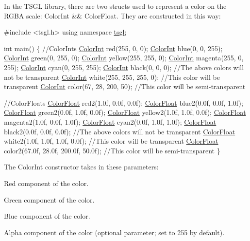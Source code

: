 In the T\+S\+G\+L library, there are two structs used to represent a color on the R\+G\+B\+A scale\+: {\ttfamily Color\+Int} \&\& {\ttfamily Color\+Float}. They are constructed in this way\+:


\begin{DoxyCode}
\textcolor{preprocessor}{#include <tsgl.h>}
\textcolor{keyword}{using namespace }\hyperlink{namespacetsgl}{tsgl};

\textcolor{keywordtype}{int} main() \{
  \textcolor{comment}{//ColorInts}
  \hyperlink{structtsgl_1_1_color_int}{ColorInt} red(255, 0, 0); 
  \hyperlink{structtsgl_1_1_color_int}{ColorInt} blue(0, 0, 255);
  \hyperlink{structtsgl_1_1_color_int}{ColorInt} green(0, 255, 0); 
  \hyperlink{structtsgl_1_1_color_int}{ColorInt} yellow(255, 255, 0);
  \hyperlink{structtsgl_1_1_color_int}{ColorInt} magenta(255, 0, 255);
  \hyperlink{structtsgl_1_1_color_int}{ColorInt} cyan(0, 255, 255);
  \hyperlink{structtsgl_1_1_color_int}{ColorInt} black(0, 0, 0);
  \textcolor{comment}{//The above colors will not be transparent}
  \hyperlink{structtsgl_1_1_color_int}{ColorInt} white(255, 255, 255, 0);  \textcolor{comment}{//This color will be transparent}
  \hyperlink{structtsgl_1_1_color_int}{ColorInt} color(67, 28, 200, 50); \textcolor{comment}{//This color will be semi-transparent  }


  \textcolor{comment}{//ColorFloats}
  \hyperlink{structtsgl_1_1_color_float}{ColorFloat} red2(1.0f, 0.0f, 0.0f); 
  \hyperlink{structtsgl_1_1_color_float}{ColorFloat} blue2(0.0f, 0.0f, 1.0f);
  \hyperlink{structtsgl_1_1_color_float}{ColorFloat} green2(0.0f, 1.0f, 0.0f); 
  \hyperlink{structtsgl_1_1_color_float}{ColorFloat} yellow2(1.0f, 1.0f, 0.0f);
  \hyperlink{structtsgl_1_1_color_float}{ColorFloat} magenta2(1.0f, 0.0f, 1.0f);
  \hyperlink{structtsgl_1_1_color_float}{ColorFloat} cyan2(0.0f, 1.0f, 1.0f);
  \hyperlink{structtsgl_1_1_color_float}{ColorFloat} black2(0.0f, 0.0f, 0.0f);
  \textcolor{comment}{//The above colors will not be transparent}
  \hyperlink{structtsgl_1_1_color_float}{ColorFloat} white2(1.0f, 1.0f, 1.0f, 0.0f); \textcolor{comment}{//This color will be transparent}
  \hyperlink{structtsgl_1_1_color_float}{ColorFloat} color2(67.0f, 28.0f, 200.0f, 50.0f); \textcolor{comment}{//This color will be semi-transparent }
\}
\end{DoxyCode}


The Color\+Int constructor takes in these parameters\+:


\begin{DoxyItemize}
\item Red component of the color.
\item Green component of the color.
\item Blue component of the color.
\item Alpha component of the color (optional parameter; set to 255 by default).
\end{DoxyItemize}

